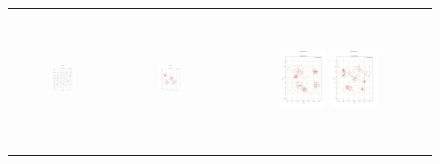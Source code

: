 \begin{figure}[p]
\begin{tabular}{ccc}
        \includegraphics[height=36mm,width=0.24\textwidth]{Images/data/11.png}
        & \includegraphics[height=36mm,width=0.24\textwidth]{Images/data/12.png}
        & \includegraphics[height=36mm,width=0.24\textwidth]{Images/data/13.png}
        \includegraphics[height=36mm,width=0.24\textwidth]{Images/data/14.png}\\[-4pt]


\end{tabular}
\end{figure}
